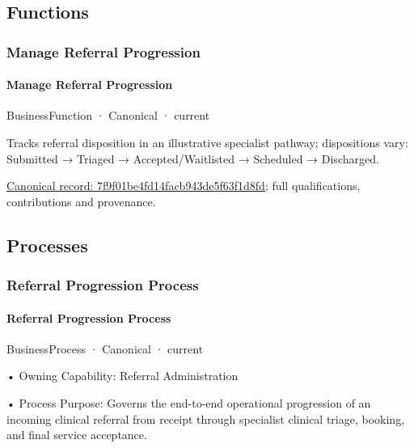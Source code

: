 \subsection{Functions}

\subsubsection{Manage Referral Progression}

\paragraph{Manage Referral Progression}

\label{element:7f9f01be4fd14facb943de5f63f1d8fd}
{\small BusinessFunction · Canonical · current}\par

Tracks referral disposition in an illustrative specialist pathway; dispositions vary: Submitted → Triaged → Accepted/Waitlisted → Scheduled → Discharged.


{\footnotesize \href{../../../../continuum/business/business-function/7f9f01be4fd14facb943de5f63f1d8fd.md}{Canonical record: 7f9f01be4fd14facb943de5f63f1d8fd}; full qualifications, contributions and provenance.}\par
\subsection{Processes}

\subsubsection{Referral Progression Process}

\paragraph{Referral Progression Process}

\label{element:cfb714e9320647ffa1dffc80dddd01d9}
{\small BusinessProcess · Canonical · current}\par

•
Owning Capability: Referral Administration



•
Process Purpose: Governs the end-to-end operational progression of an incoming clinical referral from receipt through specialist clinical triage, booking, and final service acceptance.



